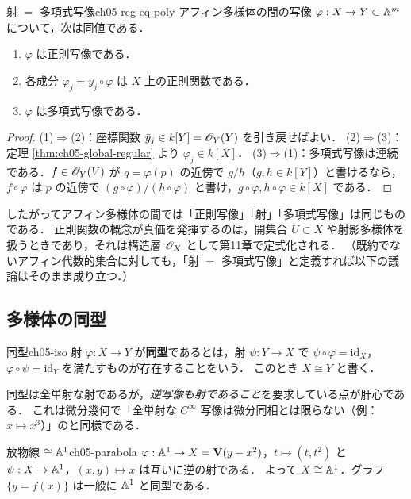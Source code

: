 \begin{myprop}{射 $=$ 多項式写像}{ch05-reg-eq-poly}
アフィン多様体の間の写像 $\varphi:X\to Y\subset\mathbb{A}^m$ について，次は同値である．
\begin{enumerate}
  \item $\varphi$ は正則写像である．
  \item 各成分 $\varphi_j=y_j\circ\varphi$ は $X$ 上の正則関数である．
  \item $\varphi$ は多項式写像である．
\end{enumerate}
\end{myprop}

\begin{proof}
(1)$\Rightarrow$(2)：座標関数 $\bar y_j\in k[Y]=\mathscr{O}_Y(Y)$ を引き戻せばよい．
(2)$\Rightarrow$(3)：定理 \ref{thm:ch05-global-regular} より $\varphi_j\in k[X]$．
(3)$\Rightarrow$(1)：多項式写像は連続である．$f\in\mathscr{O}_Y(V)$ が $q=\varphi(p)$ の近傍で $g/h$（$g,h\in k[Y]$）と書けるなら，
$f\circ\varphi$ は $p$ の近傍で $(g\circ\varphi)/(h\circ\varphi)$ と書け，$g\circ\varphi,h\circ\varphi\in k[X]$ である．
\end{proof}

したがってアフィン多様体の間では「正則写像」「射」「多項式写像」は同じものである．
正則関数の概念が真価を発揮するのは，開集合 $U\subset X$ や射影多様体を扱うときであり，それは構造層 $\mathscr{O}_X$ として第11章で定式化される．
（既約でないアフィン代数的集合に対しても，「射 $=$ 多項式写像」と定義すれば以下の議論はそのまま成り立つ．）

\subsection{多様体の同型}

\begin{mydef}{同型}{ch05-iso}
射 $\varphi:X\to Y$ が\textbf{同型}であるとは，射 $\psi:Y\to X$ で $\psi\circ\varphi=\mathrm{id}_X$，$\varphi\circ\psi=\mathrm{id}_Y$ を満たすものが存在することをいう．
このとき $X\cong Y$ と書く．
\end{mydef}

同型は全単射な射であるが，\emph{逆写像も射であること}を要求している点が肝心である．
これは微分幾何で「全単射な $C^\infty$ 写像は微分同相とは限らない（例：$x\mapsto x^3$）」のと同様である．

\begin{myex}{放物線 $\cong\mathbb{A}^1$}{ch05-parabola}
$\varphi:\mathbb{A}^1\to X=\mathbf{V}(y-x^2)$，$t\mapsto(t,t^2)$ と $\psi:X\to\mathbb{A}^1$，$(x,y)\mapsto x$ は互いに逆の射である．
よって $X\cong\mathbb{A}^1$．グラフ $\{y=f(x)\}$ は一般に $\mathbb{A}^1$ と同型である．
\end{myex}

